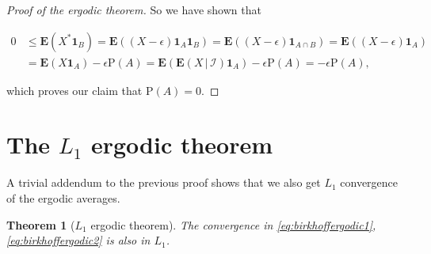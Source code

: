 \documentclass[11pt]{report}
\theoremstyle{plain}
\newtheorem{thm}{Theorem}[chapter]
\theoremstyle{definition}
\begin{document}
\begin{proof}[Proof of the ergodic theorem]
\noindent So we have shown that

\begin{align*}
0 &\le \mathbf{E}(X^*\mathbf{1}_B) = \mathbf{E}((X-\epsilon)\mathbf{1}_A \mathbf{1}_B) =
\mathbf{E}((X-\epsilon)\mathbf{1}_{A\cap B} ) = \mathbf{E}((X-\epsilon)\mathbf{1}_A ) \\&=
\mathbf{E}(X\mathbf{1}_A) - \epsilon \mathrm{P}(A)
= \mathbf{E}(\mathbf{E}\left(X\,|\,\mathcal{I}\right)\mathbf{1}_A) - \epsilon \mathrm{P}(A) = -\epsilon \mathrm{P}(A),
\end{align*}

\noindent which proves our claim that $\mathrm{P}(A)=0$.
\end{proof}

\section{The $L_1$ ergodic theorem}

A trivial addendum to the previous proof shows that
we also get $L_1$ convergence of the ergodic
averages.

\begin{thm}[$L_1$ ergodic theorem]
The convergence in \eqref{eq:birkhoffergodic1},
\eqref{eq:birkhoffergodic2} is also in $L_1$.
\end{thm}
\end{document}
